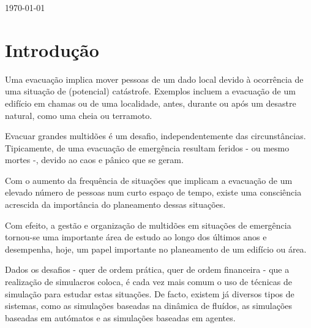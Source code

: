 \documentclass[12pt]{article}
\begin{document}
\begin{titlepage}

{\large \today}\\[0cm] %


\clearpage 

\tableofcontents

\clearpage 
\justify\normalsize

\section{Introdução} 

Uma evacuação implica mover pessoas de um dado local devido à ocorrência de uma situação de (potencial) catástrofe. Exemplos incluem a evacuação de um edifício em chamas ou de uma localidade, antes, durante ou após um desastre natural, como uma cheia ou terramoto. 

Evacuar grandes multidões é um desafio, independentemente das circunstâncias. Tipicamente, de uma evacuação de emergência resultam feridos - ou mesmo mortes -, devido ao caos e pânico que se geram.

Com o aumento da frequência de situações que implicam a evacuação de um elevado número de pessoas num curto espaço de tempo, existe uma consciência acrescida da importância do planeamento dessas situações.

Com efeito, a gestão e organização de multidões em situações de emergência tornou-se uma importante área de estudo ao longo dos últimos anos e desempenha, hoje, um papel importante no planeamento de um edifício ou área.

Dados os desafios - quer de ordem prática, quer de ordem financeira - que a realização de simulacros coloca, é cada vez mais comum o uso de técnicas de simulação para estudar estas situações. De facto, existem já diversos tipos de sistemas, como as simulações baseadas na dinâmica de fluídos, as simulações baseadas em autómatos e as simulações baseadas em agentes.


\end{titlepage}
\end{document}
